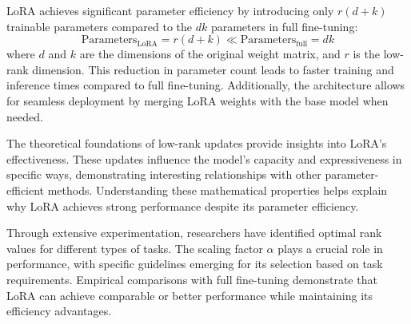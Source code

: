 \noindent
LoRA achieves significant parameter efficiency by introducing only $r(d + k)$ trainable parameters compared to the $dk$ parameters in full fine-tuning:
\begin{equation}\label{eq:lora_params}
\text{Parameters}_{\text{LoRA}} = r(d + k) \ll \text{Parameters}_{\text{full}} = dk
\end{equation}
where $d$ and $k$ are the dimensions of the original weight matrix, and $r$ is the low-rank dimension. This reduction in parameter count leads to faster training and inference times compared to full fine-tuning. Additionally, the architecture allows for seamless deployment by merging LoRA weights with the base model when needed.

\noindent
The theoretical foundations of low-rank updates provide insights into LoRA's effectiveness. These updates influence the model's capacity and expressiveness in specific ways, demonstrating interesting relationships with other parameter-efficient methods. Understanding these mathematical properties helps explain why LoRA achieves strong performance despite its parameter efficiency.

\noindent
Through extensive experimentation, researchers have identified optimal rank values for different types of tasks. The scaling factor $\alpha$ plays a crucial role in performance, with specific guidelines emerging for its selection based on task requirements. Empirical comparisons with full fine-tuning demonstrate that LoRA can achieve comparable or better performance while maintaining its efficiency advantages. 